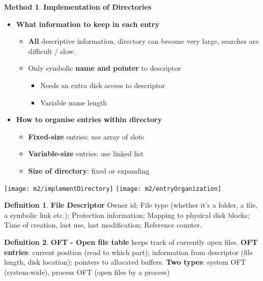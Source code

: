 \documentclass[11pt,a4paper]{article}
\theoremstyle{definition}
\newtheorem{definition}{Definition}[section]
\newtheorem{method}{Method}[section]
\newenvironment{myitemize}
{ \begin{itemize}
    \setlength{\itemsep}{5pt}
    \setlength{\parskip}{0pt}
    \setlength{\parsep}{0pt}     }
{ \end{itemize}                  }
\begin{document}
\begin{minipage}{0.45\linewidth}
	\begin{method}{\textbf{Implementation of Directories}}
		\begin{myitemize} 
		\item \textbf{What information to keep in each entry}
		\begin{myitemize}
			\item \textbf{All} descriptive information, directory can become very large, searches are difficult / slow.
			\item Only symbolic \textbf{name and pointer} to descriptor
			\begin{myitemize}
				\item Needs an extra disk access to descriptor
				\item Variable name length
			\end{myitemize}
		\end{myitemize}
		\item \textbf{How to organise entries within directory}
		\begin{myitemize}
			\item \textbf{Fixed-size} entries: use array of slots
			\item \textbf{Variable-size} entries: use linked list
			\item \textbf{Size of directory}: fixed or expanding
		\end{myitemize}
	\end{myitemize}
	\end{method}
	\end{minipage}\hspace{5mm}
	\begin{minipage}{0.5\linewidth}
		\texttt{[image: m2/implementDirectory]}
		\texttt{[image: m2/entryOrganization]}
	\end{minipage}
	
\begin{definition}{\textbf{File Descriptor}}
	Owner id; File type (whether it's a folder, a file, a symbolic link etc.); Protection information; Mapping to physical disk blocks; Time of creation, last use, last modification; Reference counter.
\end{definition}

\begin{definition}{\textbf{OFT - Open file table}}
	keeps track of currently open files. \textbf{OFT entries}: current position (read to which part); information from descriptor (file length, disk location); pointers to allocated buffers. \textbf{Two types}: system OFT (system-wide), process OFT (open files by a process)
\end{definition}
\end{document}
